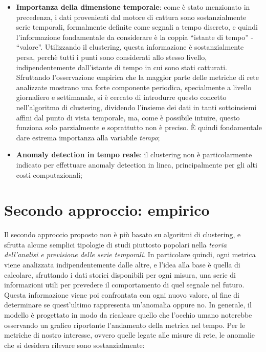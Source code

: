 \documentclass[12pt,a4paper,cucitura]{toptesi}
\begin{document}
\begin{itemize}
\item \textbf{Importanza della dimensione temporale}: come è stato menzionato in precedenza, i dati provenienti dal motore di cattura sono sostanzialmente serie temporali, formalmente definite come segnali a tempo discreto, e quindi l'informazione fondamentale da considerare è la coppia ``istante di tempo'' - ``valore''.
Utilizzando il clustering, questa informazione è sostanzialmente persa, perchè tutti i punti sono considerati allo stesso livello, indipendentemente dall'istante di tempo in cui sono stati catturati.
Sfruttando l'osservazione empirica che la maggior parte delle metriche di rete analizzate mostrano una forte componente periodica, specialmente a livello giornaliero e settimanale, si è cercato di introdurre questo concetto nell'algoritmo di clustering, dividendo l'insieme dei dati in tanti sottoinsiemi affini dal punto di vista temporale, ma, come è possibile intuire, questo funziona solo parzialmente e soprattutto non è preciso.
\`{E} quindi fondamentale dare estrema importanza alla variabile \emph{tempo};
\item \textbf{Anomaly detection in tempo reale}: il clustering non è particolarmente indicato per effettuare anomaly detection in linea, principalmente per gli alti costi computazionali;
\end{itemize}

\section{Secondo approccio: empirico}

Il secondo approccio proposto non è più basato su algoritmi di clustering, e sfrutta alcune semplici tipologie di studi piuttosto popolari nella \emph{teoria dell'analisi e previsione delle serie temporali}.
In particolare quindi, ogni metrica viene analizzata indipendentemente dalle altre, e l'idea alla base è quella di calcolare, sfruttando i dati storici disponibili per ogni misura, una serie di informazioni utili per prevedere il comportamento di quel segnale nel futuro.
Questa informazione viene poi confrontata con ogni nuovo valore, al fine di determinare se quest'ultimo rappresenta un'anomalia oppure no.
In generale, il modello è progettato in modo da ricalcare quello che l'occhio umano noterebbe osservando un grafico riportante l'andamento della metrica nel tempo.
Per le metriche di nostro interesse, ovvero quelle legate alle misure di rete, le anomalie che si desidera rilevare sono sostanzialmente:
\end{document}
